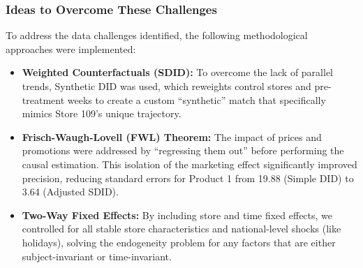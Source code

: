 \documentclass[
  letterpaper,
  DIV=11,
  numbers=noendperiod]{scrartcl}
\providecommand{\tightlist}{%
  \setlength{\itemsep}{0pt}\setlength{\parskip}{0pt}}
\begin{document}
\subsubsection{Ideas to Overcome These
Challenges}\label{ideas-to-overcome-these-challenges}

To address the data challenges identified, the following methodological
approaches were implemented:

\begin{itemize}
\tightlist
\item
  \textbf{Weighted Counterfactuals (SDID):} To overcome the lack of
  parallel trends, Synthetic DID was used, which reweights control
  stores and pre-treatment weeks to create a custom ``synthetic'' match
  that specifically mimics Store 109's unique trajectory.
\item
  \textbf{Frisch-Waugh-Lovell (FWL) Theorem:} The impact of prices and
  promotions were addressed by ``regressing them out'' before performing
  the causal estimation. This isolation of the marketing effect
  significantly improved precision, reducing standard errors for Product
  1 from 19.88 (Simple DID) to 3.64 (Adjusted SDID).
\item
  \textbf{Two-Way Fixed Effects:} By including store and time fixed
  effects, we controlled for all stable store characteristics and
  national-level shocks (like holidays), solving the endogeneity problem
  for any factors that are either subject-invariant or time-invariant.
\end{itemize}
\end{document}

